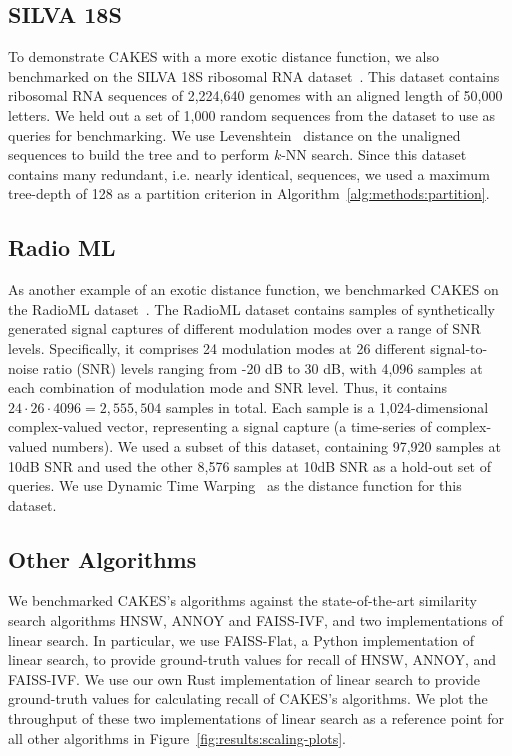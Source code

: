 \subsection{SILVA 18S}
\label{sec:datasets-and-benchmarks:silva-18s}

To demonstrate CAKES with a more exotic distance function, we also benchmarked on the SILVA 18S ribosomal RNA dataset~\cite{10.1093/nar/gks1219}.
This dataset contains ribosomal RNA sequences of 2,224,640 genomes with an aligned length of 50,000 letters.
We held out a set of 1,000 random sequences from the dataset to use as queries for benchmarking.
We use Levenshtein~\cite{levenshtein1966binary} distance on the unaligned sequences to build the tree and to perform $k$-NN search.
Since this dataset contains many redundant, i.e. nearly identical, sequences, we used a maximum tree-depth of 128 as a partition criterion in Algorithm~\ref{alg:methods:partition}.


\subsection{Radio ML}
\label{sec:datasets-and-benchmarks:radio-ml}

As another example of an exotic distance function, we benchmarked CAKES on the RadioML dataset~\cite{oshea2018radioml}.
The RadioML dataset contains samples of synthetically generated signal captures of different modulation modes over a range of SNR levels.
Specifically, it comprises 24 modulation modes at 26 different signal-to-noise ratio (SNR) levels ranging from -20 dB to 30 dB, with 4,096 samples at each combination of modulation mode and SNR level.
Thus, it contains $24 \cdot 26 \cdot 4096 = 2,555,504$ samples in total.
Each sample is a 1,024-dimensional complex-valued vector, representing a signal capture (a time-series of complex-valued numbers).
We used a subset of this dataset, containing 97,920 samples at 10dB SNR and used the other 8,576 samples at 10dB SNR as a hold-out set of queries.
We use Dynamic Time Warping~\cite{muller2007dynamic} as the distance function for this dataset.


\subsection{Other Algorithms}
\label{sec:datasets-and-benchmarks:other-algorithms}

We benchmarked CAKES's algorithms against the state-of-the-art similarity search algorithms HNSW, ANNOY and FAISS-IVF, and two implementations of linear search.
In particular, we use FAISS-Flat, a Python implementation of linear search, to provide ground-truth values for recall of HNSW, ANNOY, and FAISS-IVF.
We use our own Rust implementation of linear search to provide ground-truth values for calculating recall of CAKES's algorithms.
We plot the throughput of these two implementations of linear search as a reference point for all other algorithms in Figure~\ref{fig:results:scaling-plots}.
